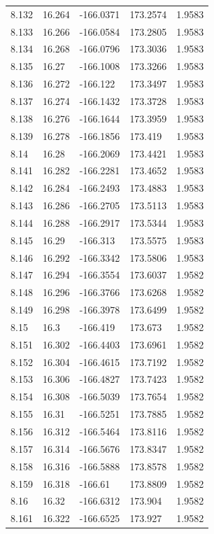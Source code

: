 \begin{tabular}{lllll}
8.132 & 16.264 & -166.0371 & 173.2574 & 1.9583 \\
8.133 & 16.266 & -166.0584 & 173.2805 & 1.9583 \\
8.134 & 16.268 & -166.0796 & 173.3036 & 1.9583 \\
8.135 & 16.27 & -166.1008 & 173.3266 & 1.9583 \\
8.136 & 16.272 & -166.122 & 173.3497 & 1.9583 \\
8.137 & 16.274 & -166.1432 & 173.3728 & 1.9583 \\
8.138 & 16.276 & -166.1644 & 173.3959 & 1.9583 \\
8.139 & 16.278 & -166.1856 & 173.419 & 1.9583 \\
8.14 & 16.28 & -166.2069 & 173.4421 & 1.9583 \\
8.141 & 16.282 & -166.2281 & 173.4652 & 1.9583 \\
8.142 & 16.284 & -166.2493 & 173.4883 & 1.9583 \\
8.143 & 16.286 & -166.2705 & 173.5113 & 1.9583 \\
8.144 & 16.288 & -166.2917 & 173.5344 & 1.9583 \\
8.145 & 16.29 & -166.313 & 173.5575 & 1.9583 \\
8.146 & 16.292 & -166.3342 & 173.5806 & 1.9583 \\
8.147 & 16.294 & -166.3554 & 173.6037 & 1.9582 \\
8.148 & 16.296 & -166.3766 & 173.6268 & 1.9582 \\
8.149 & 16.298 & -166.3978 & 173.6499 & 1.9582 \\
8.15 & 16.3 & -166.419 & 173.673 & 1.9582 \\
8.151 & 16.302 & -166.4403 & 173.6961 & 1.9582 \\
8.152 & 16.304 & -166.4615 & 173.7192 & 1.9582 \\
8.153 & 16.306 & -166.4827 & 173.7423 & 1.9582 \\
8.154 & 16.308 & -166.5039 & 173.7654 & 1.9582 \\
8.155 & 16.31 & -166.5251 & 173.7885 & 1.9582 \\
8.156 & 16.312 & -166.5464 & 173.8116 & 1.9582 \\
8.157 & 16.314 & -166.5676 & 173.8347 & 1.9582 \\
8.158 & 16.316 & -166.5888 & 173.8578 & 1.9582 \\
8.159 & 16.318 & -166.61 & 173.8809 & 1.9582 \\
8.16 & 16.32 & -166.6312 & 173.904 & 1.9582 \\
8.161 & 16.322 & -166.6525 & 173.927 & 1.9582 \\

\end{tabular}
